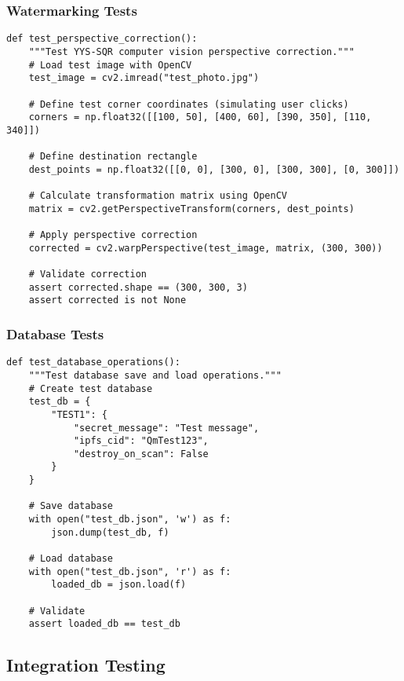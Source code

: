 \documentclass[12pt,a4paper]{article}
\begin{document}
\subsubsection{Watermarking Tests}
\begin{lstlisting}[caption=Watermarking Test Example]
def test_perspective_correction():
    """Test YYS-SQR computer vision perspective correction."""
    # Load test image with OpenCV
    test_image = cv2.imread("test_photo.jpg")
    
    # Define test corner coordinates (simulating user clicks)
    corners = np.float32([[100, 50], [400, 60], [390, 350], [110, 340]])
    
    # Define destination rectangle
    dest_points = np.float32([[0, 0], [300, 0], [300, 300], [0, 300]])
    
    # Calculate transformation matrix using OpenCV
    matrix = cv2.getPerspectiveTransform(corners, dest_points)
    
    # Apply perspective correction
    corrected = cv2.warpPerspective(test_image, matrix, (300, 300))
    
    # Validate correction
    assert corrected.shape == (300, 300, 3)
    assert corrected is not None
\end{lstlisting}

\subsubsection{Database Tests}
\begin{lstlisting}[caption=Database Test Example]
def test_database_operations():
    """Test database save and load operations."""
    # Create test database
    test_db = {
        "TEST1": {
            "secret_message": "Test message",
            "ipfs_cid": "QmTest123",
            "destroy_on_scan": False
        }
    }
    
    # Save database
    with open("test_db.json", 'w') as f:
        json.dump(test_db, f)
    
    # Load database
    with open("test_db.json", 'r') as f:
        loaded_db = json.load(f)
    
    # Validate
    assert loaded_db == test_db
\end{lstlisting}

\subsection{Integration Testing}
\end{document}
